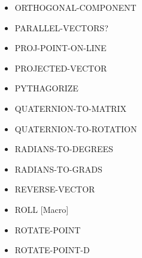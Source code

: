 \documentclass [11pt]{book}
\begin{document}
\begin{itemize}
\item {}ORTHOGONAL-COMPONENT





\item {}PARALLEL-VECTORS?





\item {}PROJ-POINT-ON-LINE





\item {}PROJECTED-VECTOR





\item {}PYTHAGORIZE





\item {}QUATERNION-TO-MATRIX





\item {}QUATERNION-TO-ROTATION





\item {}RADIANS-TO-DEGREES





\item {}RADIANS-TO-GRADS





\item {}REVERSE-VECTOR





\item {}ROLL [Macro]





\item {}ROTATE-POINT





\item {}ROTATE-POINT-D






\end{itemize}
\end{document}
